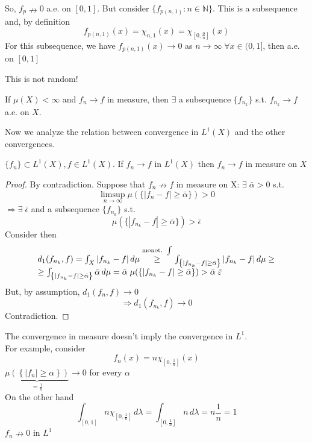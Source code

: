 \begin{remark}
    So, \(f_p \nrightarrow 0\) a.e. on \([0,1]\). But consider \( \{ f_{p(n,1)}: n \in \mathbb{N} \} \). 
    This is a subsequence and, by definition 
    \[ 
        f_{p(n, 1)}(x) = \chi_{n, 1}(x)= \chi_{\left[0, \frac{0}{n} \right]}(x) 
    \] 
    For this subsequence, we have \( f_{p(n,1)}(x) \rightarrow 0 \) as \( n \to\infty \; \forall x \in (0, 1] \), then a.e. on \(\left[0, 1\right]\)
    
    This is not random!

\end{remark}

\begin{proposition}
    If \(\mu(X) < \infty \) and \(f_n \rightarrow f \) in measure, then \(\exists\) a subsequence \(\{f_{n_k} \}\) s.t. \(f_{n_k} \to f \) a.e. on \(X\).
\end{proposition}
Now we analyze the relation between convergence in \(L^1(X)\) and the other convergences.

\begin{theorem}
    \( \{f_n\} \subset L^1(X), f \in L^1(X) \). If \(f_n \rightarrow f \) in \(L^1(X)\) then \(f_n \rightarrow f \) in measure on \(X\)
\end{theorem}
\begin{proof}
    By contradiction. Suppose that \(f_n \nrightarrow f \) in measure on X: 
    \( \exists \; \bar{\alpha} > 0 \) s.t. 
    \[ 
        \limsup_{n\to\infty} \mu(\{ |f_n-f| \geq \bar{\alpha} \}) > 0 
    \]
    \(\Rightarrow \exists \; \bar{\epsilon}\) and a subsequence \( \{ f_{n_k} \} \) s.t.
    \[ 
        \mu(\{ |f_{n_k}-f| \geq \bar{\alpha} \}) > \bar{\epsilon} 
    \]
    Consider then 
    \[  
        \begin{array}{l}
        d_1(f_{n_k}, f) 
        = \int_X |f_{n_k} - f| \, d\mu  
        \overset{\text{monot. } \int}{\geq} \int_{\left\{|f_{n_k}-f|\geq \bar{\alpha}  \right\}} \abs{f_{n_k} -f} \, d\mu  \geq\\
        \geq \int_{\left\{|f_{n_k}-f|\geq \bar{\alpha}  \right\}} \bar{\alpha} \, d\mu 
        = \bar{\alpha} \; \mu (\{|f_{n_k } - f| \geq \bar{\alpha}\}) 
        > \bar{\alpha} \; \bar{\varepsilon}    
        \end{array}
    \]
    But, by assumption, \(d_1(f_n, f) \rightarrow 0\)
    \[ 
        \Rightarrow d_1(f_{n_k}, f) \rightarrow 0 
    \] 
    Contradiction.
\end{proof}

\begin{remark}
    The convergence in measure doesn't imply the convergence in \(L^1\). \\ For example, consider 
    \[ 
        f_n (x) = n \chi_{\left[0, \frac{1}{n} \right]}(x) 
    \]
    \( \underbrace{\mu \left( \left\{ |f_n| \geq \alpha \right\}\right)}_{= \frac{1}{n}} \to 0 \) for every \(\alpha\) \\
    On the other hand 
    \[ 
        \int _{\left[0, 1\right]} n \chi_{\left[0, \frac{1}{n} \right]} \, d\lambda 
        = \int_{\left[0, \frac{1}{n}\right]} n \, d\lambda 
        = n \frac{1}{n} = 1
    \]
    \( f_n \nrightarrow 0\) in \(L^1\) 
\end{remark}

